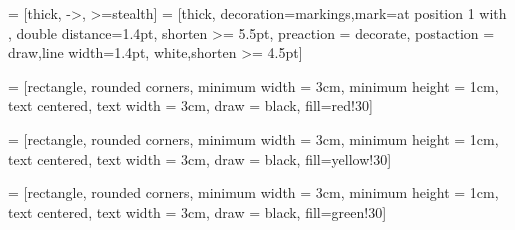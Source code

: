 \usepackage[T3]{fontenc}
\usepackage[utf8]{inputenc}
\usepackage[russian]{babel}

\usepackage[top=2cm, bottom=2cm, left=2cm, right=2cm]{geometry}

\usepackage{amsmath}
\usepackage{amsfonts}
\usepackage{amssymb}
\usepackage{amsthm} %

\usepackage{dsfont} %
\usepackage{bbm} %

\usepackage{fancyhdr}
\pagestyle{fancy}

\fancyhf{}
\renewcommand{\sectionmark}[1]{\markright{\thesection\ #1}} %
\renewcommand{\subsectionmark}[1]{\markright{\thesubsection\ #1}} %

\rhead{\fancyplain{}{\rightmark }} %
\cfoot{\fancyplain{}{\thepage}} %

\renewcommand{\headrulewidth}{1 pt} %
\renewcommand{\footrulewidth}{1 pt} %

\usepackage{graphicx}

\usepackage[toc, page]{appendix}
\usepackage{titlesec}

\usepackage{tikz}
\usetikzlibrary{shapes.geometric, arrows, positioning, decorations.markings}

 = [thick, ->, >=stealth]
 = [thick, decoration={markings,mark=at position
   1 with {}},
   double distance=1.4pt, shorten >= 5.5pt,
   preaction = {decorate},
   postaction = {draw,line width=1.4pt, white,shorten >= 4.5pt}]

 = [rectangle, rounded corners, minimum width = 3cm, minimum height = 1cm, text centered, text width = 3cm, draw = black, fill=red!30]

 = [rectangle, rounded corners, minimum width = 3cm, minimum height = 1cm, text centered, text width = 3cm, draw = black, fill=yellow!30]

 = [rectangle, rounded corners, minimum width = 3cm, minimum height = 1cm, text centered, text width = 3cm, draw = black, fill=green!30]
